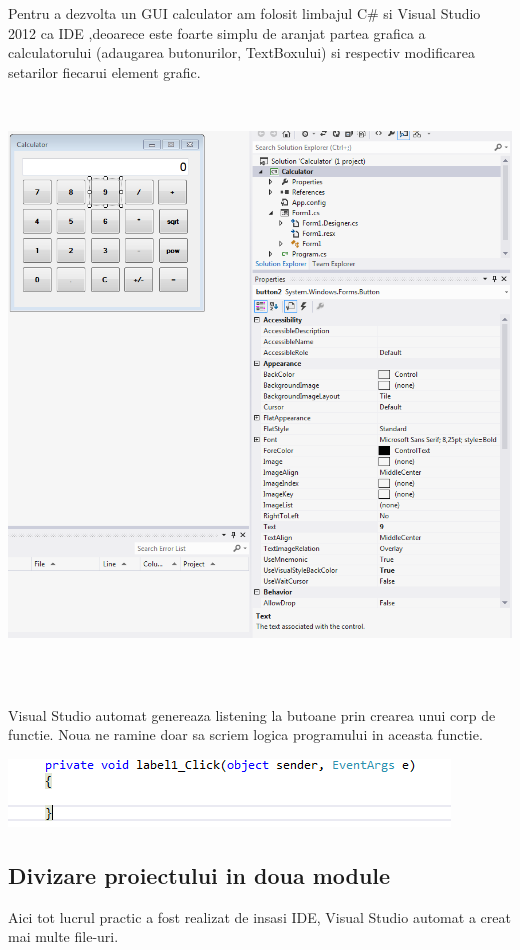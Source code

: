 \documentclass[a4paper, 12pt]{article}
\begin{document}
Pentru a dezvolta un GUI calculator am folosit limbajul C\# si Visual Studio 2012 ca IDE ,deoarece este foarte simplu de aranjat partea grafica a calculatorului (adaugarea butonurilor, TextBoxului) si respectiv modificarea setarilor fiecarui element grafic.
\newpage
\includegraphics*[width=15cm, height=16cm]{GUI}

Visual Studio automat genereaza listening la butoane prin crearea unui corp de functie. Noua ne ramine doar sa scriem logica programului in aceasta functie.

\includegraphics*{listen}

\subsection{Divizare proiectului in doua module }
Aici tot lucrul practic a fost realizat de insasi IDE, Visual Studio automat a creat mai multe file-uri.
\end{document}
